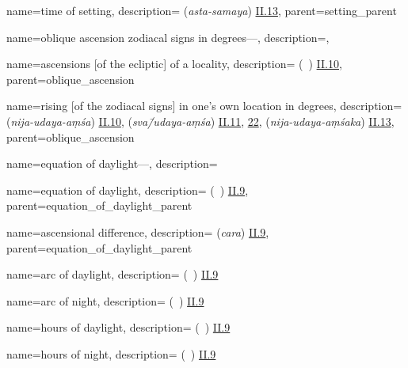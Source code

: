 {
        name={time of setting},
        description={ (\textit{asta-samaya}) \hyperlink{Sii13}{II.13}},
        parent={setting_parent}
}

{
        name={oblique ascension zodiacal signs in degrees---},
        description={\phantom{x}\nopagebreak},
}

{
        name={ascensions [of the ecliptic] of a locality},
        description={ (\matali\idafaconsonant\ \balad) \hyperlink{Pii10}{II.10}},
        parent={oblique_ascension}
}

{
        name={rising [of the zodiacal signs] in one's own location in degrees},
        description={ (\textit{nija-udaya-aṃśa}) \hyperlink{Sii10}{II.10},  (\textit{sva\=/udaya-aṃśa}) \hyperlink{Sii11}{II.11}, \hyperlink{Sii22}{22},  (\textit{nija-udaya-aṃśaka}) \hyperlink{Sii13}{II.13}},
        parent={oblique_ascension}
}


{
        name={equation of daylight---},
        description={\phantom{x}\nopagebreak}
}

{
        name={equation of daylight},
        description={ (\tadil\ \alnahar) \hyperlink{Pii9}{II.9}},
        parent={equation_of_daylight_parent}
}

{
        name={ascensional difference},
        description={ (\textit{cara}) \hyperlink{Sii9}{II.9}},
        parent={equation_of_daylight_parent}
}
        
{
        name={arc of daylight},
        description={ (\qaws\ \alnahar) \hyperlink{Pii9}{II.9}}
}

{
        name={arc of night},
        description={ (\qaws\ \allayl) \hyperlink{Pii9}{II.9}}
}

{
        name={hours of daylight},
        description={ (\saat\ \alnahar) \hyperlink{Pii9}{II.9}}
}

{
        name={hours of night},
        description={ (\saat\ \allayl) \hyperlink{Pii9}{II.9}}
}


